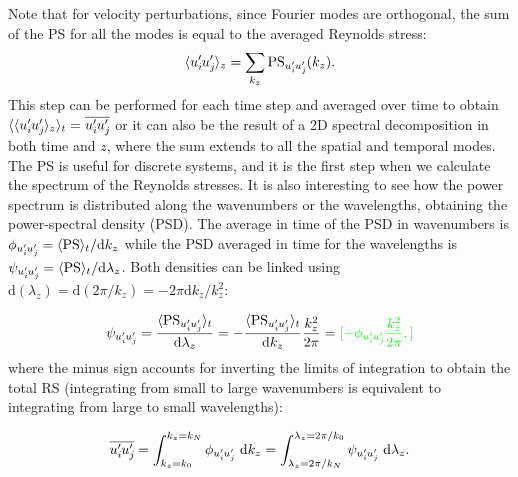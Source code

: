 Note that for velocity perturbations, since Fourier modes are orthogonal, the sum of the PS for all the modes is equal to the averaged Reynolds stress:
\begin{equation}
    \label{eq:sum_PS_cap3}
    \langle u_i^{\prime}\mkern-1.2mu u_j^{\prime}\mkern-1.2mu \rangle_{z} = \sum_{k_z} \mathrm{PS}_{u_i^{\prime}\mkern-1.2mu u_j^{\prime}\mkern-1.2mu}(k_z).
\end{equation}
This step can be performed for each time step and averaged over time to obtain $\langle\langle u_i^{\prime}\mkern-1.2mu u_j^{\prime}\mkern-1.2mu \rangle_{z}\rangle_{t} = \overline{u_i^{\prime}\mkern-1.2mu u_j^{\prime}\mkern-1.2mu}$ or it can also be the result of a 2D spectral decomposition in both time and $z$, where the sum extends to all the spatial and temporal modes.
The PS is useful for discrete systems, and it is the first step when we calculate the spectrum of the Reynolds stresses. It is also interesting to see how the power spectrum is distributed along the wavenumbers or the wavelengths, obtaining the power-spectral density (PSD).
The average in time of the PSD in wavenumbers is $\phi_{u_i^{\prime}\mkern-1.2mu u_j^{\prime}\mkern-1.2mu}=\langle \mathrm{PS} \rangle_t/\mathrm{d} k_z$ while the PSD averaged in time for the wavelengths is $\psi_{u_i^{\prime}\mkern-1.2mu u_j^{\prime}\mkern-1.2mu}= \langle \mathrm{PS} \rangle_t/\mathrm{d} \lambda_z$. Both densities can be linked using $\mathrm{d}(\lambda_z) = \mathrm{d}(2\pi/k_z) = -2\pi\mathrm{d}k_z/k_z^2$:

\begin{equation}
    \psi_{u_i^{\prime}\mkern-1.2mu u_j^{\prime}\mkern-1.2mu} = 
    \frac{ \langle \mathrm{PS}_{u_i^{\prime}\mkern-1.2mu u_j^{\prime}\mkern-1.2mu} \rangle_t}{\mathrm{d} \lambda_z} =
    -\frac{ \langle \mathrm{PS}_{u_i^{\prime}\mkern-1.2mu u_j^{\prime}\mkern-1.2mu} \rangle_t}{\mathrm{d} k_z} \frac{k_z^2}{2\pi}=
    {\color{green}[-\phi_{u_i^{\prime}\mkern-1.2mu u_j^{\prime}\mkern-1.2mu} \frac{k_z^2}{2\pi},]}
\end{equation}
where the minus sign accounts for inverting the limits of integration to obtain the total RS (integrating from small to large wavenumbers is equivalent to integrating from large to small wavelengths):

\begin{equation}
\label{eq:sum_ps}
    \overline{u_i^{\prime}\mkern-1.2mu u_j^{\prime}\mkern-1.2mu} = 
    \int_{k_z=k_0}^{k_z=k_{N}}   \phi_{u_i^{\prime}\mkern-1.2mu u_j^{\prime}\mkern-1.2mu}  ~ \mathrm{d} k_z =
    \int^{\lambda_z = 2\pi/k_0}_{\lambda_z = 2\pi/k_{N}}  \psi_{u_i^{\prime}\mkern-1.2mu u_j^{\prime}\mkern-1.2mu}  ~ \mathrm{d} \lambda_z.
\end{equation}

